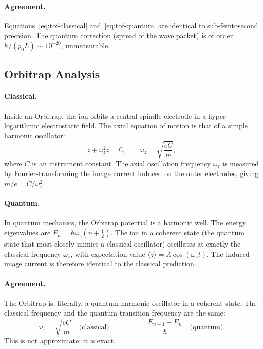 \paragraph{Agreement.}
Equations~\eqref{eq:tof-classical} and~\eqref{eq:tof-quantum} are identical
to sub-femtosecond precision.
The quantum correction (spread of the wave packet) is of order
$\hbar/(p_0 L) \sim 10^{-20}$, unmeasurable.

\subsection{Orbitrap Analysis}
\label{sec:ch1-orbitrap}

\paragraph{Classical.}
Inside an Orbitrap, the ion orbits a central spindle electrode in a
hyper-logarithmic electrostatic field.
The axial equation of motion is that of a simple harmonic oscillator:
\begin{equation}\label{eq:orbitrap-axial}
  \ddot{z} + \omega_z^2 z = 0, \qquad
  \omega_z = \sqrt{\frac{eC}{m}},
\end{equation}
where $C$ is an instrument constant.
The axial oscillation frequency $\omega_z$ is measured by Fourier-transforming
the image current induced on the outer electrodes, giving $m/e = C/\omega_z^2$.

\paragraph{Quantum.}
In quantum mechanics, the Orbitrap potential is a harmonic well.
The energy eigenvalues are $E_n = \hbar\omega_z(n + \tfrac{1}{2})$.
The ion in a coherent state (the quantum state that most closely mimics a
classical oscillator) oscillates at exactly the classical frequency $\omega_z$,
with expectation value $\langle z \rangle = A\cos(\omega_z t)$.
The induced image current is therefore identical to the classical prediction.

\paragraph{Agreement.}
The Orbitrap is, literally, a quantum harmonic oscillator in a coherent state.
The classical frequency and the quantum transition frequency are the same:
\begin{equation}
  \omega_z = \sqrt{\frac{eC}{m}} \quad \text{(classical)} \qquad = \qquad
  \frac{E_{n+1} - E_n}{\hbar} \quad \text{(quantum)}.
\end{equation}
This is not approximate; it is exact.

